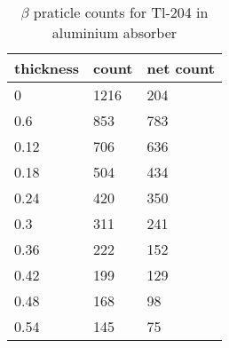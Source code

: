 \begin{table}[!ht]
    \centering
    \begin{tabular}{|l|l|l|}
    \hline
        thickness & count & net count \\ \hline
        0 & 1216 & 204 \\ \hline
        0.6 & 853 & 783 \\ \hline
        0.12 & 706 & 636 \\ \hline
        0.18 & 504 & 434 \\ \hline
        0.24 & 420 & 350 \\ \hline
        0.3 & 311 & 241 \\ \hline
        0.36 & 222 & 152 \\ \hline
        0.42 & 199 & 129 \\ \hline
        0.48 & 168 & 98 \\ \hline
        0.54 & 145 & 75 \\ \hline
    \end{tabular}

    \caption{$\beta$ praticle counts for  Tl-204 in aluminium absorber}
\end{table}